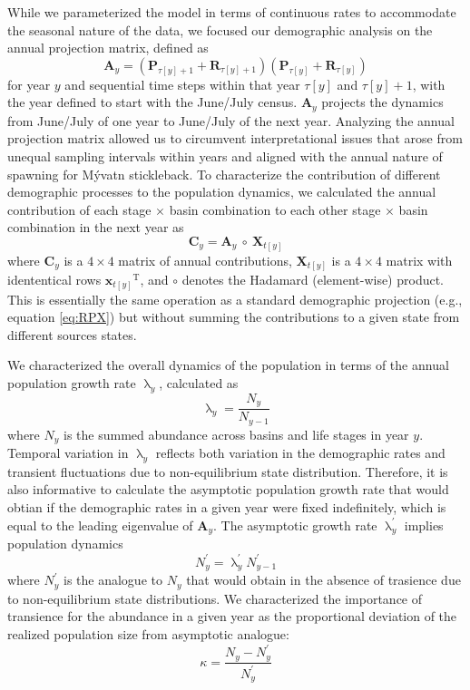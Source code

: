 {While we parameterized the model in terms of continuous rates
to accommodate the seasonal nature of the data,
we focused our demographic analysis on the annual projection matrix, 
defined as 
%
\begin{equation} \label{eq:A}
\mathbf{A}_y = \left(\mathbf{P}_{\tau[y]+1} + \mathbf{R}_{\tau[y]+1}\right) 
                \left(\mathbf{P}_{\tau[y]} + \mathbf{R}_{\tau[y]}\right)
\end{equation}
%
for year $y$ and sequential time steps within that year $\tau[y]$ and $\tau[y]+1$,
with the year defined to start with the June/July census.
$\mathbf{A}_y$ projects the dynamics from
June/July of one year to June/July of the next year.
Analyzing the annual projection matrix allowed us to circumvent interpretational
issues that arose from unequal sampling intervals within years
and aligned with the annual nature of spawning for M\'{y}vatn stickleback.
To characterize the contribution of different demographic processes 
to the population dynamics,
we calculated the annual contribution of each stage $\times$ basin combination 
to each other stage $\times$ basin combination in the next year as
%
\begin{equation} \label{eq:A}
\mathbf{C}_y = \mathbf{A}_y~{\circ}~\mathbf{X}_{t[y]}
\end{equation}
%
where $\mathbf{C}_{y}$ is a $4\times 4$ matrix of annual contributions,
$\mathbf{X}_{t[y]}$ is a $4\times 4$ matrix 
with idententical rows ${\mathbf{x}_{t[y]}}^\text{T}$,
and ${\circ}$ denotes the Hadamard (element-wise) product. 
This is essentially the same operation as a standard demographic projection
(e.g., equation \ref{eq:RPX}) but without summing the contributions to a given state
from different sources states. 


We characterized the overall dynamics of the population in terms of the annual 
population growth rate $\uplambda_y$, calculated as
%
\begin{equation} \label{eq:lam-n}
\uplambda_y = \frac{N_y}{N_{y-1}}
\end{equation}
%
where $N_y$ is the summed abundance across basins and life stages in year $y$.
Temporal variation in $\uplambda_y$ reflects both variation in the demographic rates
and transient fluctuations due to non-equilibrium state distribution. 
Therefore, it is also informative to calculate the asymptotic population growth rate that 
would obtian if the demographic rates in a given year were fixed indefinitely, 
which is equal to the leading eigenvalue of $\mathbf{A}_y$. 
The asymptotic growth rate $\uplambda^{'}_y$ implies population dynamics
%
\begin{equation} \label{eq:n-prime}
N^{'}_y = \uplambda^{'}_y N^{'}_{y-1}
\end{equation}
%
where $N^{'}_y$ is the analogue to $N_y$ that would obtain in the absence of 
trasience due to non-equilibrium state distributions.
We characterized the importance of transience for the abundance in a given year
as the proportional deviation of the realized population size from asymptotic analogue:
%
\begin{equation} \label{eq:dev}
\kappa = \frac{N_y - N^{'}_{y}}{N^{'}_y}
\end{equation}
%

}
